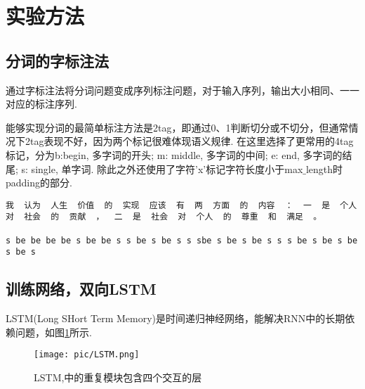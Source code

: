 \documentclass[paper=a4, fontsize=11pt]{scrartcl} %
\numberwithin{equation}{section} %
\numberwithin{figure}{section} %
\numberwithin{table}{section} %
\begin{document}





\section{实验方法}
\subsection{分词的字标注法}
通过字标注法将分词问题变成序列标注问题，对于输入序列，输出大小相同、一一对应的标注序列.

能够实现分词的最简单标注方法是2tag，即通过0、1判断切分或不切分，但通常情况下2tag表现不好，因为两个标记很难体现语义规律.
在这里选择了更常用的4tag标记，分为{b:begin, 多字词的开头; m: middle, 多字词的中间; e: end, 多字词的结尾; s: single, 单字词}.
除此之外还使用了字符'x'标记字符长度小于max$\_$length时padding的部分.
\begin{lstlisting}
我  认为  人生  价值  的  实现  应该  有  两  方面  的  内容  ：  一  是  个人  对  社会  的  贡献  ，  二  是  社会  对  个人  的  尊重  和  满足  。

s be be be be s be be s s be s be s s sbe s be s be s s s be s be s be s be s
\end{lstlisting}

\subsection{训练网络，双向LSTM}
LSTM(Long SHort Term Memory)是时间递归神经网络，能解决RNN中的长期依赖问题，如图\ref{pic_lstm}所示.

\begin{figure}[htb]
    \centering
    \texttt{[image: pic/LSTM.png]}
    \caption{LSTM,中的重复模块包含四个交互的层}
    \label{pic_lstm}
\end{figure}
\end{document}
